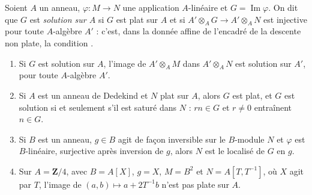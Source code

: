 \begin{encadre}
\begin{enonce}
Soient $A$ un anneau, $\varphi : M \to N$ une application $A$-linéaire et $G = \operatorname{Im}\varphi$. On dit que $G$ est \emph{solution sur $A$} si $G$ est plat sur $A$ et si $A' \otimes_A G \to A' \otimes_A N$ est injective pour toute $A$-algèbre $A'$ : c'est, dans la donnée affine de l'encadré de la descente non plate, la condition .
\begin{enumerate}
\item Si $G$ est solution sur $A$, l'image de $A' \otimes_A M$ dans $A' \otimes_A N$ est solution sur $A'$, pour toute $A$-algèbre $A'$.
\item Si $A$ est un anneau de Dedekind et $N$ plat sur $A$, alors $G$ est plat, et $G$ est solution si et seulement s'il est saturé dans $N$ : $rn \in G$ et $r \neq 0$ entraînent $n \in G$.
\item Si $B$ est un anneau, $g \in B$ agit de façon inversible sur le $B$-module $N$ et $\varphi$ est $B$-linéaire, surjective après inversion de $g$, alors $N$ est le localisé de $G$ en $g$.
\item Sur $A = \mathbf Z/4$, avec $B = A[X]$, $g = X$, $M = B^2$ et $N = A[T, T^{-1}]$, où $X$ agit par $T$, l'image de $(a, b) \mapsto a + 2T^{-1}b$ n'est pas plate sur $A$.
\end{enumerate}
\end{enonce}
\end{encadre}
